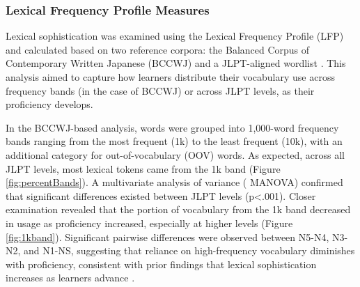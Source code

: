 \subsubsection{Lexical Frequency Profile Measures}
Lexical sophistication was examined using the Lexical Frequency Profile (LFP) and calculated based on two
reference corpora: the
Balanced Corpus of
Contemporary Written Japanese (BCCWJ) \citep{maekawa2014} and a JLPT-aligned wordlist \citep{jisho.org}. This
analysis aimed to capture how learners distribute their vocabulary use across frequency bands (in the case of BCCWJ) or
across JLPT levels,
as their proficiency develops.




In the BCCWJ-based analysis, words were grouped into 1,000-word frequency bands ranging from the most frequent (1k)
to the
least frequent (10k), with an additional category for out-of-vocabulary (OOV) words. As expected, across all JLPT
levels, most lexical tokens came from the 1k band (Figure~
\ref{fig:percentBands}). A multivariate analysis of variance (
MANOVA)
confirmed that significant differences existed between JLPT levels (p<.001). Closer examination revealed that the
portion of vocabulary from the 1k band decreased in usage as proficiency increased, especially at higher levels (Figure~
\ref{fig:1kband}). Significant pairwise differences were observed between N5-N4, N3-N2, and N1-NS, suggesting that
reliance on high-frequency vocabulary diminishes with proficiency, consistent with prior findings that lexical
sophistication increases as learners advance \citep{Laufer1995}.


